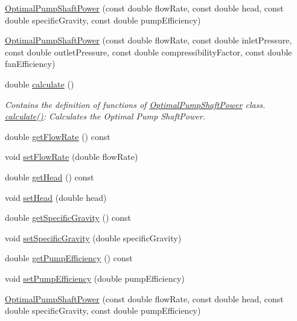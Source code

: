 \begin{DoxyCompactItemize}
\item 
\hyperlink{class_optimal_pump_shaft_power_a40e47716e0c8ecab5deb9eae4c8f9bd0}{Optimal\+Pump\+Shaft\+Power} (const double flow\+Rate, const double head, const double specific\+Gravity, const double pump\+Efficiency)
\item 
\hyperlink{class_optimal_pump_shaft_power_a322ac55881a0170cd4042fcf8a6a9eab}{Optimal\+Pump\+Shaft\+Power} (const double flow\+Rate, const double inlet\+Pressure, const double outlet\+Pressure, const double compressibility\+Factor, const double fan\+Efficiency)
\item 
double \hyperlink{class_optimal_pump_shaft_power_a23ab040eea0a9e0431988bd353076237}{calculate} ()
\begin{DoxyCompactList}\small\item\em Contains the definition of functions of \hyperlink{class_optimal_pump_shaft_power}{Optimal\+Pump\+Shaft\+Power} class. \hyperlink{class_optimal_pump_shaft_power_a23ab040eea0a9e0431988bd353076237}{calculate()}\+: Calculates the Optimal Pump Shaft\+Power. \end{DoxyCompactList}\item 
double \hyperlink{class_optimal_pump_shaft_power_a8c1532459a196347f7d5219d4690a490}{get\+Flow\+Rate} () const
\item 
void \hyperlink{class_optimal_pump_shaft_power_a38efdee39db4c3856915f1ab26d44ed2}{set\+Flow\+Rate} (double flow\+Rate)
\item 
double \hyperlink{class_optimal_pump_shaft_power_abb285a8a256c10187113c34db1a4462b}{get\+Head} () const
\item 
void \hyperlink{class_optimal_pump_shaft_power_aa080c62ff92fc70a4e27e7710e490b62}{set\+Head} (double head)
\item 
double \hyperlink{class_optimal_pump_shaft_power_a607d32c56edece639e03007adc1bf325}{get\+Specific\+Gravity} () const
\item 
void \hyperlink{class_optimal_pump_shaft_power_aa565a332e4b144c8eb85fd06c541199e}{set\+Specific\+Gravity} (double specific\+Gravity)
\item 
double \hyperlink{class_optimal_pump_shaft_power_a77b9c639438f9d6008c20948f173a2c4}{get\+Pump\+Efficiency} () const
\item 
void \hyperlink{class_optimal_pump_shaft_power_a2cb2c6b537c7db0bc5071f09c66308d0}{set\+Pump\+Efficiency} (double pump\+Efficiency)
\item 
\hyperlink{class_optimal_pump_shaft_power_a40e47716e0c8ecab5deb9eae4c8f9bd0}{Optimal\+Pump\+Shaft\+Power} (const double flow\+Rate, const double head, const double specific\+Gravity, const double pump\+Efficiency)

\end{DoxyCompactItemize}
